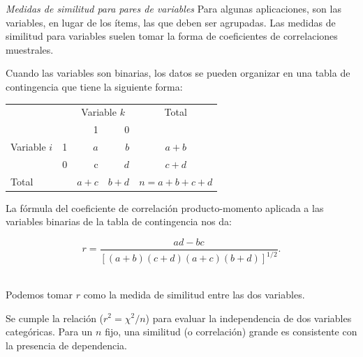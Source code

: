 \documentclass[spanish]{beamer}
\begin{document}
\begin{frame}{\textit{Medidas de similitud para pares de variables}}
Para algunas aplicaciones, son las variables, en lugar de los ítems, las que deben ser agrupadas. Las medidas de similitud para variables suelen tomar la forma de coeficientes de correlaciones muestrales.\break

Cuando las variables son binarias, los datos se pueden organizar en una tabla de contingencia que tiene la siguiente forma:

\begin{table}[h]
  \centering
\resizebox{7.5cm}{!} {
\begin{tabular}{llrrrr}
\multicolumn{2}{l}{\multirow{}{}{}} & \multicolumn{2}{c}{Variable $k$} & \multicolumn{2}{c}{\multirow{}{}{Total}} \\\cmidrule{3-4}
\multicolumn{2}{l}{}                  & 1             & 0       & \multicolumn{2}{c}{}                        \\ \hline
\multirow{}{}{Variable $i$}       & 1      & $a$          & $b$       & \multicolumn{2}{c}{$a+b$}                     \\
                              & 0      & c            & $d$       & \multicolumn{2}{c}{$c+d$}                     \\ \hline
\multicolumn{2}{l}{Total}            & $a+c$          & $b+d$     & \multicolumn{2}{c}{$n=a+b+c+d$}\\
\bottomrule            
\end{tabular}
}
\end{table}
\end{frame}

\begin{frame}{}
La fórmula del coeficiente de correlación producto-momento aplicada a las variables binarias de la tabla de contingencia nos da:

$$r = \frac{ad-bc}{[(a+b)(c+d)(a+c)(b+d)]^{1/2}}.$$\

Podemos tomar $r$ como la medida de similitud entre las dos variables.\break

Se cumple la relación ($r^2=\chi^2/n$) para evaluar la independencia de dos variables categóricas. Para un $n$ fijo, una similitud (o correlación) grande es consistente con la presencia de dependencia.
\end{frame}
\end{document}
